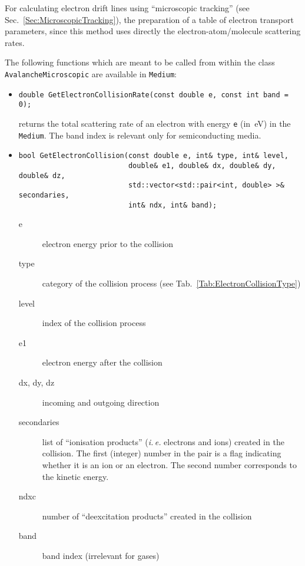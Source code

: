 For calculating electron drift lines using ``microscopic tracking'' 
(see Sec.~\ref{Sec:MicroscopicTracking}),
the preparation of a table of electron transport parameters, 
since this method uses directly the electron-atom/molecule 
scattering rates. 

The following functions which are meant to be called from within the 
class \texttt{AvalancheMicroscopic} are available in \texttt{Medium}:
\begin{itemize}
  \item
\begin{lstlisting}
double GetElectronCollisionRate(const double e, const int band = 0);
\end{lstlisting}
returns the total scattering rate of an electron with energy \texttt{e} 
(in~eV) in the \texttt{Medium}. The band index is relevant only 
for semiconducting media.
  \item
\begin{lstlisting}
bool GetElectronCollision(const double e, int& type, int& level,
                          double& e1, double& dx, double& dy, double& dz,
                          std::vector<std::pair<int, double> >& secondaries,
                          int& ndx, int& band);
\end{lstlisting}
\begin{description}
  \item[e]          electron energy prior to the collision
  \item[type]       category of the collision process
                    (see Tab.~\ref{Tab:ElectronCollisionType})
  \item[level]      index of the collision process
  \item[e1]         electron energy after the collision
  \item[dx, dy, dz] incoming and outgoing direction
  \item[secondaries] list of ``ionisation products'' 
                    (\textit{i.\,e.} electrons and ions) 
                    created in the collision. 
                    The first (integer) number in the pair is a flag indicating whether 
                    it is an ion or an electron. The second number corresponds to the kinetic energy. 
  \item[ndxc]       number of ``deexcitation products'' 
                    created in the collision
  \item[band]       band index (irrelevant for gases) 
\end{description}
\end{itemize}

